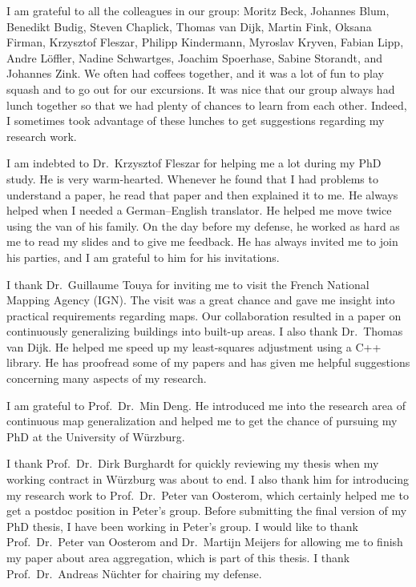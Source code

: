 {I am grateful to all the colleagues in our group:
Moritz Beck, Johannes Blum, Benedikt Budig, 
Steven Chaplick, Thomas van Dijk, 
Martin Fink, Oksana Firman, Krzysztof Fleszar, 
Philipp Kindermann, Myroslav Kryven, 
Fabian Lipp, Andre L\"offler, 
Nadine Schwartges, Joachim Spoerhase, Sabine Storandt, 
and Johannes Zink.
%
We often had coffees together,
and it was a lot of fun to play squash and to go out for our excursions.
It was nice that our group always had lunch together
so that we had plenty of chances to learn from each other.
Indeed, I sometimes took advantage of these lunches
to get suggestions regarding my research work.

I am indebted to Dr.\ Krzysztof Fleszar for 
helping me a lot during my PhD study.
He is very warm-hearted.
Whenever he found that I had problems to understand a paper,
he read that paper and then explained it to me.
He always helped when I needed a German--English translator.
He helped me move twice using the van of his family.
On the day before my defense, he worked as hard as me
to read my slides and to give me feedback.
He has always invited me to join his parties, 
and I am grateful to him for his invitations.

I thank Dr.\ Guillaume Touya for inviting me to visit
the French National Mapping Agency (IGN).
The visit was a great chance and gave me insight into
practical requirements regarding maps.
Our collaboration resulted in a paper on continuously
generalizing buildings into built-up areas.
%
I also thank Dr.\ Thomas van Dijk.
He helped me speed up my 
least-squares adjustment using a C++ library.
He has proofread some of my papers
and has given me helpful suggestions 
concerning many aspects of my research.

I am grateful to Prof.\ Dr.\ Min Deng.
He introduced me into the research area of 
continuous map generalization 
and helped me to get the chance of
pursuing my PhD at the University of W\"urzburg.

I thank Prof.\ Dr.\ Dirk Burghardt 
for quickly reviewing my thesis
when my working contract in W\"urzburg was about to end.
I also thank him for introducing my research work to
Prof.\ Dr.\ Peter van Oosterom, 
which certainly helped me to get a postdoc position
in Peter's group.
Before submitting the final version of my PhD thesis,
I have been working in Peter's group.
I would like to thank 
Prof.\ Dr.\ Peter van Oosterom and Dr.\ Martijn Meijers 
for allowing me to finish my paper about area aggregation,
which is part of this thesis. 
I thank Prof.\ Dr.\ Andreas N\"uchter for chairing my defense.

}
